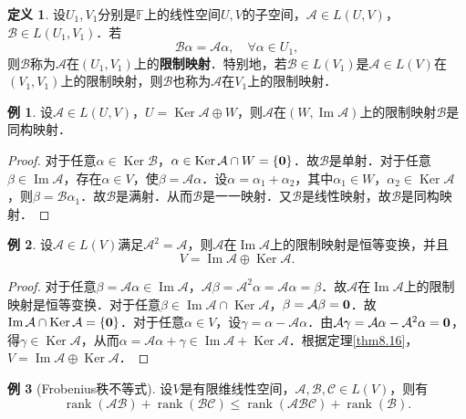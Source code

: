 \documentclass[a4paper,fontset=windows]{ctexbook}
\theoremstyle{definition}
\newtheorem{definition}{定义}[chapter]
\newtheorem{example}{例}[chapter]
\DeclareMathOperator{\im}{Im}
\DeclareMathOperator{\Ker}{Ker}
\DeclareMathOperator{\rank}{rank}
\renewcommand{\le}{\leqslant}
\begin{document}
\begin{definition}
设$U_1,V_1$分别是$\mathbb{F}$上的线性空间$U,V$的子空间，$\mathcal{A}\in L(U,V)$，$\mathcal{B}\in L(U_1,V_1)$．若
$$\mathcal{B}\alpha=\mathcal{A}\alpha,\quad\forall\alpha\in U_1,$$
则$\mathcal{B}$称为$\mathcal{A}$在$(U_1,V_1)$上的{\bf 限制映射}．特别地，若$\mathcal{B}\in L(V_1)$是$\mathcal{A}\in L(V)$在$(V_1,V_1)$上的限制映射，则$\mathcal{B}$也称为$\mathcal{A}$在$V_1$上的限制映射．
\end{definition}

\begin{example}
设$\mathcal{A}\in L(U,V)$，$U=\Ker\mathcal{A}\oplus W$，则$\mathcal{A}$在$(W,\im\mathcal{A})$上的限制映射$\mathcal{B}$是同构映射．
\end{example}

\begin{proof}
对于任意$\alpha\in\Ker\mathcal{B}$，$\alpha\in\Ker\mathcal{A}\cap W=\{{\bf 0}\}$．故$\mathcal{B}$是单射．对于任意$\beta\in\im\mathcal{A}$，存在$\alpha\in V$，使$\beta=\mathcal{A}\alpha$．设$\alpha=\alpha_1+\alpha_2$，其中$\alpha_1\in W$，$\alpha_2\in\Ker\mathcal{A}$，则$\beta=\mathcal{B}\alpha_1$．故$\mathcal{B}$是满射．从而$\mathcal{B}$是一一映射．又$\mathcal{B}$是线性映射，故$\mathcal{B}$是同构映射．
\end{proof}

\begin{example}
设$\mathcal{A}\in L(V)$满足$\mathcal{A}^2=\mathcal{A}$，则$\mathcal{A}$在$\im\mathcal{A}$上的限制映射是恒等变换，并且
$$V=\im\mathcal{A}\oplus\Ker\mathcal{A}.$$
\end{example}

\begin{proof}
对于任意$\beta=\mathcal{A}\alpha\in\im\mathcal{A}$，$\mathcal{A}\beta=\mathcal{A}^2\alpha=\mathcal{A}\alpha=\beta$．故$\mathcal{A}$在$\im\mathcal{A}$上的限制映射是恒等变换．对于任意$\beta\in\im\mathcal{A}\cap\Ker\mathcal{A}$，$\beta=\mathcal{A}\beta={\bf 0}$．故$\im\mathcal{A}\cap\Ker\mathcal{A}=\{{\bf 0}\}$．对于任意$\alpha\in V$，设$\gamma=\alpha-\mathcal{A}\alpha$．由$\mathcal{A}\gamma=\mathcal{A}\alpha-\mathcal{A}^2\alpha={\bf 0}$，得$\gamma\in\Ker\mathcal{A}$，从而$\alpha=\mathcal{A}\alpha+\gamma\in\im\mathcal{A}+\Ker\mathcal{A}$．根据定理\ref{thm8.16}，$V=\im\mathcal{A}\oplus\Ker\mathcal{A}$．
\end{proof}

\begin{example}[Frobenius秩不等式]
设$V$是有限维线性空间，$\mathcal{A,B,C}\in L(V)$，则有
$$\rank(\mathcal{AB})+\rank(\mathcal{BC})\le\rank(\mathcal{ABC})+\rank(\mathcal{B}).$$
\end{example}
\end{document}
